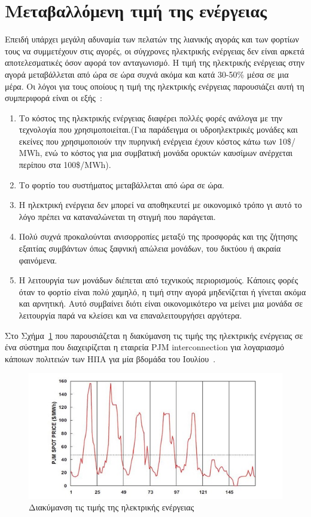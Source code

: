 \section{Μεταβαλλόμενη τιμή της ενέργειας}
Επειδή υπάρχει μεγάλη αδυναμία των πελατών της λιανικής αγοράς και των φορτίων τους να συμμετέχουν στις αγορές, οι σύγχρονες ηλεκτρικής ενέργειας δεν είναι αρκετά αποτελεσματικές όσον αφορά τον ανταγωνισμό. Η τιμή της ηλεκτρικής ενέργειας στην αγορά μεταβάλλεται από ώρα σε ώρα συχνά ακόμα και κατά 30-50\% μέσα σε μια μέρα. Οι λόγοι για τους οποίους η τιμή της ηλεκτρικής ενέργειας παρουσιάζει αυτή τη συμπεριφορά είναι οι εξής~\cite{[R85],[G95]}:
\begin{enumerate}
\item	Το κόστος της ηλεκτρικής ενέργειας διαφέρει πολλές φορές ανάλογα με την τεχνολογία που χρησιμοποιείται.(Για παράδειγμα οι υδροηλεκτρικές μονάδες και εκείνες που χρησιμοποιούν την πυρηνική ενέργεια έχουν κόστος κάτω των 10\$/ΜWh, ενώ το κόστος για μια συμβατική μονάδα ορυκτών καυσίμων ανέρχεται περίπου στα 100\$/MWh).
\item	Το φορτίο του συστήματος μεταβάλλεται από ώρα σε ώρα.
\item	Η ηλεκτρική ενέργεια δεν μπορεί να αποθηκευτεί με οικονομικό τρόπο γι αυτό το λόγο πρέπει να καταναλώνεται τη στιγμή που παράγεται.
\item	Πολύ συχνά προκαλούνται ανισορροπίες μεταξύ της προσφοράς και της ζήτησης εξαιτίας συμβάντων όπως ξαφνική απώλεια μονάδων, του δικτύου ή ακραία φαινόμενα.
\item	Η λειτουργία των μονάδων διέπεται από τεχνικούς περιορισμούς. Κάποιες φορές όταν το φορτίο είναι πολύ χαμηλό, η τιμή στην αγορά μηδενίζεται ή γίνεται ακόμα και αρνητική. Αυτό συμβαίνει διότι είναι οικονομικότερο να μείνει μια μονάδα σε λειτουργία παρά να κλείσει και να επαναλειτουργήσει αργότερα.
\end{enumerate}

 
Στο Σχήμα~\ref{dataconnection} που παρουσιάζεται η διακύμανση τις τιμής της ηλεκτρικής ενέργειας σε ένα σύστημα που διαχειρίζεται η εταιρεία PJM interconnection για λογαριασμό κάποιων πολιτειών των ΗΠΑ για μία βδομάδα του Ιουλίου~\cite{[MR99],
[G95],[P91]}. 

\begin{figure}[t]
	\includegraphics[scale=0.9]{figures/fig2-1.jpg}
	\centering
	\caption{Διακύμανση τις τιμής της ηλεκτρικής ενέργειας}
	\label{dataconnection}
\end{figure}

